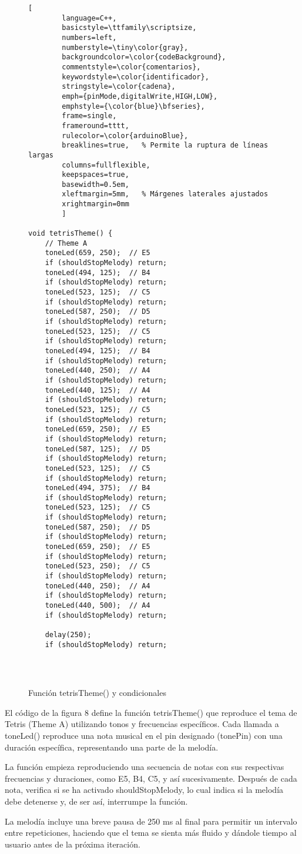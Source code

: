 
\setlength{\parindent}{0pt}
\setlength{\parskip}{6pt}
\begin{figure}[H]
	\centering
	\begin{lstlisting}[
		language=C++,
		basicstyle=\ttfamily\scriptsize,
		numbers=left,
		numberstyle=\tiny\color{gray},
		backgroundcolor=\color{codeBackground},
		commentstyle=\color{comentarios},
		keywordstyle=\color{identificador},
		stringstyle=\color{cadena},
		emph={pinMode,digitalWrite,HIGH,LOW},
		emphstyle={\color{blue}\bfseries},
		frame=single,
		frameround=tttt,
		rulecolor=\color{arduinoBlue},
		breaklines=true,   % Permite la ruptura de líneas largas
		columns=fullflexible,
		keepspaces=true,
		basewidth=0.5em,
		xleftmargin=5mm,   % Márgenes laterales ajustados
		xrightmargin=0mm
		]
		
void tetrisTheme() {
	// Theme A
	toneLed(659, 250);  // E5
	if (shouldStopMelody) return;
	toneLed(494, 125);  // B4
	if (shouldStopMelody) return;
	toneLed(523, 125);  // C5
	if (shouldStopMelody) return;
	toneLed(587, 250);  // D5
	if (shouldStopMelody) return;
	toneLed(523, 125);  // C5
	if (shouldStopMelody) return;
	toneLed(494, 125);  // B4
	if (shouldStopMelody) return;
	toneLed(440, 250);  // A4
	if (shouldStopMelody) return;
	toneLed(440, 125);  // A4
	if (shouldStopMelody) return;
	toneLed(523, 125);  // C5
	if (shouldStopMelody) return;
	toneLed(659, 250);  // E5
	if (shouldStopMelody) return;
	toneLed(587, 125);  // D5
	if (shouldStopMelody) return;
	toneLed(523, 125);  // C5
	if (shouldStopMelody) return;
	toneLed(494, 375);  // B4
	if (shouldStopMelody) return;
	toneLed(523, 125);  // C5
	if (shouldStopMelody) return;
	toneLed(587, 250);  // D5
	if (shouldStopMelody) return;
	toneLed(659, 250);  // E5
	if (shouldStopMelody) return;
	toneLed(523, 250);  // C5
	if (shouldStopMelody) return;
	toneLed(440, 250);  // A4
	if (shouldStopMelody) return;
	toneLed(440, 500);  // A4
	if (shouldStopMelody) return;
	
	delay(250);  
	if (shouldStopMelody) return;
		
		
		
	\end{lstlisting}
	\caption{Función tetrisTheme() y condicionales}
	\label{fig:codigo-led}
\end{figure}
El código de la figura 8 define la función tetrisTheme() que reproduce el tema de Tetris (Theme A) utilizando tonos y frecuencias específicos. Cada llamada a toneLed() reproduce una nota musical en el pin designado (tonePin) con una duración específica, representando una parte de la melodía.

La función empieza reproduciendo una secuencia de notas con sus respectivas frecuencias y duraciones, como E5, B4, C5, y así sucesivamente. Después de cada nota, verifica si se ha activado shouldStopMelody, lo cual indica si la melodía debe detenerse y, de ser así, interrumpe la función.

La melodía incluye una breve pausa de 250 ms al final para permitir un intervalo entre repeticiones, haciendo que el tema se sienta más fluido y dándole tiempo al usuario antes de la próxima iteración.